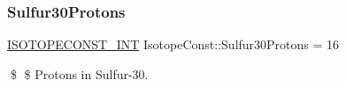 \subsubsection{\texorpdfstring{Sulfur30\+Protons}{Sulfur30Protons}}
{\footnotesize\ttfamily \mbox{\hyperlink{group___isotope_const-_macros_ga5f18360b3e99483a35c32d789e62621c}{I\+S\+O\+T\+O\+P\+E\+C\+O\+N\+S\+T\+\_\+\+I\+NT}} Isotope\+Const\+::\+Sulfur30\+Protons = 16}

\$ \$ Protons in Sulfur-\/30. 